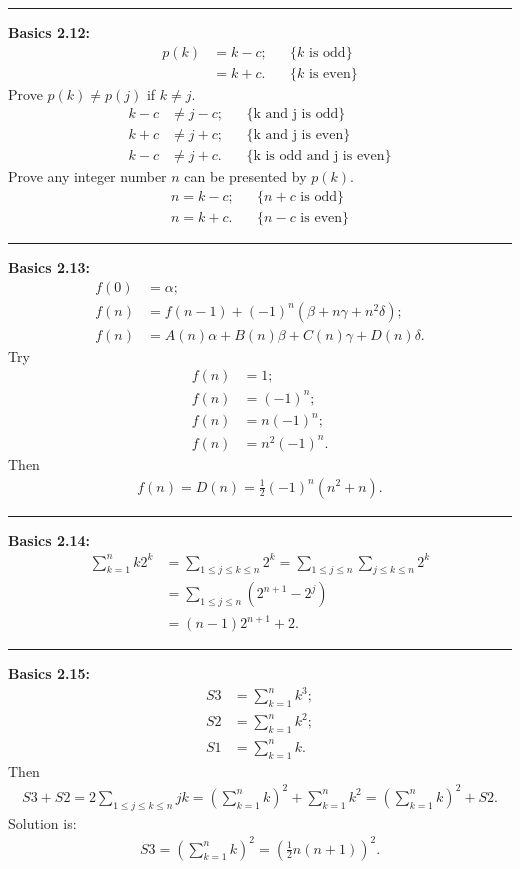 \documentclass{article}
\begin{document}
\noindent\rule{\textwidth}{0.4pt}
\textbf{Basics 2.12:}
\begin{align}
p(k) &= k - c; && \{ k \text{ is odd} \} \\
     &= k + c. && \{ k \text{ is even} \}
\end{align}
Prove $p(k) \neq p(j)$ if $k \neq j$.
\begin{align}
k - c &\neq j - c; && \{\text{k and j is odd}\}\\
k + c &\neq j + c; && \{\text{k and j is even}\}\\
k - c &\neq j + c. && \{\text{k is odd and j is even}\}
\end{align}
Prove any integer number $n$ can be presented by $p(k)$.
\begin{align}
n = k - c;&& \{n+c\text{ is odd}\}\\
n = k + c.&& \{n-c\text{ is even}\}
\end{align}

\noindent\rule{\textwidth}{0.4pt}
\textbf{Basics 2.13:}
\begin{align}
f(0) &= \alpha;\\
f(n) &= f(n-1) + (-1)^n(\beta + n \gamma + n^2 \delta);\\
f(n) &= A(n) \alpha + B(n) \beta + C(n) \gamma + D(n) \delta.
\end{align}
Try
\begin{align}
f(n) &= 1;\\
f(n) &= (-1)^n;\\
f(n) &= n(-1)^n;\\
f(n) &= n^2(-1)^n.
\end{align}
Then
\begin{align}
f(n) = D(n) = \frac{1}{2}(-1)^n(n^2+n).
\end{align}

\noindent\rule{\textwidth}{0.4pt}
\textbf{Basics 2.14:}
\begin{align}
\sum_{k=1}^n k2^k &= \sum_{1\le j \le k \le n} 2^k = \sum_{1 \le j \le n} \sum_{j \le k \le n} 2^k \\
		  &= \sum_{1 \le j \le n} (2^{n+1} - 2^j) \\
		  &= (n-1)2^{n+1} + 2.
\end{align}

\noindent\rule{\textwidth}{0.4pt}
\textbf{Basics 2.15:}
\begin{align}
S3 &= \sum_{k=1}^nk^3;\\
S2 &= \sum_{k=1}^nk^2;\\
S1 &= \sum_{k=1}^nk.
\end{align}
Then
\begin{align}
S3 + S2 = 2\sum_{1 \le j \le k \le n}jk = (\sum_{k=1}^n k)^2 + \sum_{k=1}^n k^2 = (\sum_{k=1}^n k)^2 + S2.
\end{align}
Solution is:
\begin{align}
S3 = (\sum_{k=1}^n k)^2 = (\frac{1}{2}n(n+1))^2.
\end{align}
\end{document}
